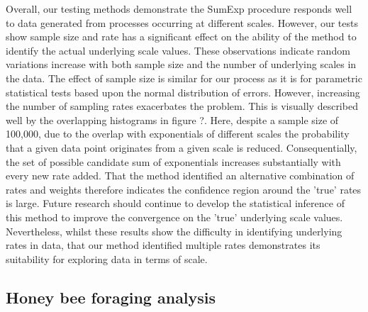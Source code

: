 \documentclass[11pt,usenames,dvipsnames]{article}
\begin{document}
\begin{linenumbers}
Overall, our testing methods demonstrate the SumExp procedure responds well to data generated from processes occurring at different scales. However, our tests show sample size and rate has a significant effect on the ability of the method to identify the actual underlying scale values. These observations indicate random variations increase with both sample size and the number of underlying scales in the data. The effect of sample size is similar for our process as it is for parametric statistical tests based upon the normal distribution of errors. However, increasing the number of sampling rates exacerbates the problem. This is visually described well by the overlapping histograms in figure ?. Here, despite a sample size of 100,000, due to the overlap with exponentials of different scales the probability that a given data point originates from a given scale is reduced. Consequentially, the set of possible candidate sum of exponentials increases substantially with every new rate added. That the method identified an alternative combination of rates and weights therefore indicates the confidence region around the 'true' rates is large. Future research should continue to develop the statistical inference of this method to improve the convergence on the 'true' underlying scale values. Nevertheless, whilst these results show the difficulty in identifying underlying rates in data, that our method identified multiple rates demonstrates its suitability for exploring data in terms of scale.
\end{linenumbers}

\subsection{Honey bee foraging analysis}
\end{document}

